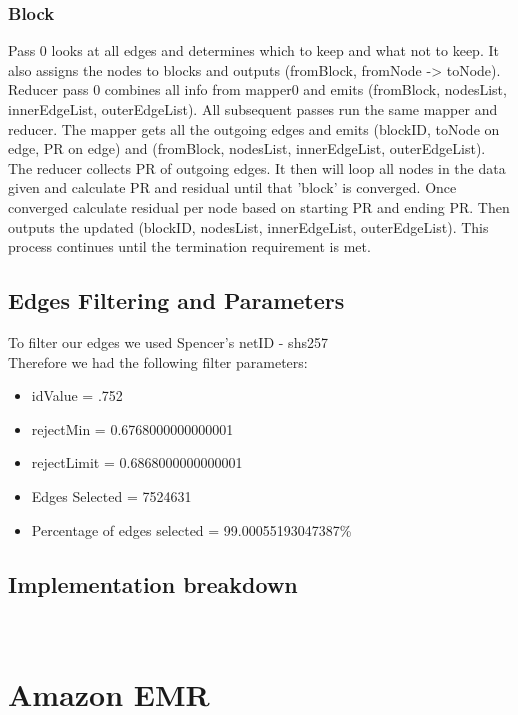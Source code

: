 \documentclass[11pt,letterpaper]{article}
\begin{document}
\subsubsection{Block} Pass 0 looks at all edges and determines which to keep and what not to keep. It also assigns the nodes to blocks and outputs (fromBlock, fromNode -> toNode). Reducer pass 0 combines all info from mapper0 and emits (fromBlock, nodesList, innerEdgeList, outerEdgeList). All subsequent passes run the same mapper and reducer. The mapper gets all the outgoing edges and emits (blockID, toNode on edge, PR on edge) and (fromBlock, nodesList, innerEdgeList, outerEdgeList). The reducer collects PR of outgoing edges. It then will loop all nodes in the data given and calculate PR and residual until that 'block' is converged. Once converged calculate residual per node based on starting PR and ending PR. Then outputs the updated (blockID, nodesList, innerEdgeList, outerEdgeList). This process continues until the termination requirement is met. 
\\
\subsection{Edges Filtering and Parameters}
To filter our edges we used Spencer's netID - shs257 \\
Therefore we had the following filter parameters:
\begin{itemize}
\item idValue = .752
\item rejectMin = 0.6768000000000001
\item rejectLimit = 0.6868000000000001
\item Edges Selected = 7524631
\item Percentage of edges selected = 99.00055193047387\%
\end{itemize}
\subsection{Implementation breakdown}
\\
\section{Amazon EMR}
\end{document}
